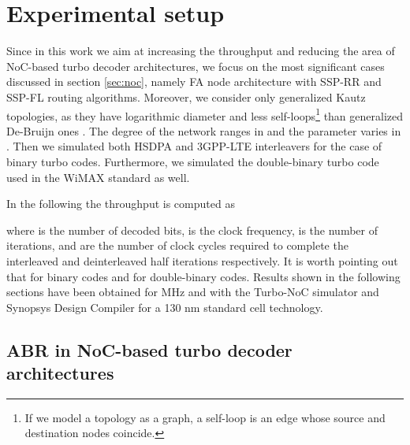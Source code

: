 \documentclass[10pt,twocolumn,journal]{IEEEtran}
\begin{document}
\section{Experimental setup}
\label{sec:setup}

Since in this work we aim at increasing the throughput and reducing the area of NoC-based turbo decoder 
architectures, we focus on the most significant cases discussed in section \ref{sec:noc}, namely FA node 
architecture with SSP-RR and SSP-FL routing algorithms. Moreover, we consider only 
generalized Kautz topologies, as they have logarithmic diameter and less self-loops\footnote{If we model a
topology as a graph, a self-loop is an edge whose source and destination nodes coincide.} than 
generalized De-Bruijn ones \cite{imase_TC81, imase_TC83, martina_TCASI10}. The degree of the network  ranges in  and the parameter  varies in 
. Then we simulated both HSDPA and 3GPP-LTE interleavers for the case of binary turbo 
codes. Furthermore, we simulated the double-binary turbo code used in the WiMAX standard as well.

In the following the throughput is computed as

where  is the number of decoded bits,  is the clock frequency,  is the number of iterations, 
 and  are the number of clock cycles required to complete the interleaved 
and deinterleaved half iterations respectively. It is worth pointing out that  for binary codes and  
for double-binary codes. Results shown in the following sections have been obtained for  MHz and 
 with the Turbo-NoC simulator \cite{turbo_NOC_download} and Synopsys Design Compiler 
for a 130 nm standard cell technology.

\subsection{ABR in NoC-based turbo decoder architectures}
\label{subsec:abr}
\end{document}
